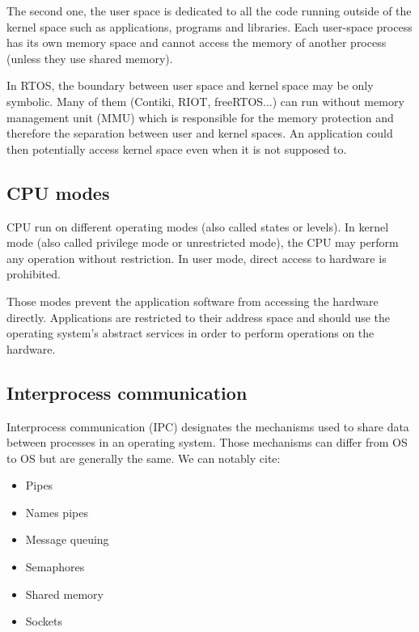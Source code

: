 The second one, the user space is dedicated to all the code running outside of the kernel space such as applications, programs and libraries.
Each user-space process has its own memory space and cannot access the memory of another process (unless they use shared memory)\cite{usna}.

In RTOS, the boundary between user space and kernel space may be only symbolic.
Many of them (Contiki, RIOT, freeRTOS...) can run without memory management unit (MMU) 
    which is responsible for the memory protection and therefore the separation between user and kernel spaces.
An application could then potentially access kernel space even when it is not supposed to.

\subsection{CPU modes}
CPU run on different operating modes (also called states or levels).
In kernel mode (also called privilege mode or unrestricted mode), the CPU may perform any operation without restriction.
In user mode, direct access to hardware is prohibited.

Those modes prevent the application software from accessing the hardware directly.
Applications are restricted to their address space 
    and should use the operating system's abstract services in order to perform operations on the hardware\cite{TUHS}.

\subsection{Interprocess communication}
Interprocess communication (IPC) designates the mechanisms used to share data between processes in an operating system.
Those mechanisms can differ from OS to OS but are generally the same.
We can notably cite\cite{ipc}:
\begin{itemize}
    \item Pipes
    \item Names pipes
    \item Message queuing
    \item Semaphores
    \item Shared memory
    \item Sockets
\end{itemize}

